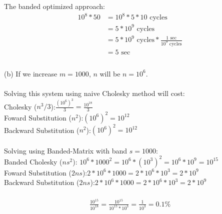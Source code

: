 \documentclass{article}
\begin{document}
	The banded optimized approach:\\
	\begin{align*}
	10^{8} * 50 &=	10^{8} * 5*10 \text{ cycles}\\
	&= 5*10^{9} \text{ cycles}\\
	&= 5*10^{9} \text{ cycles} * \frac{1 \text{ sec}}{10^9 \text{ cycles}}\\
	&= 5 \text{ sec}\\		
	\end{align*}
	\\
	(b) If we increase $m=1000$, $n$ will be $n=10^6$.\\\\
	Solving this system using naive Cholesky method will cost:\\
	Cholesky ($n^3/3$):$\frac{(10^6)^3}{3}=\frac{10^{18}}{3}$\\
	Foward Substitution ($n^2$):$(10^6)^2=10^{12}$\\
	Backward Substitution ($n^2$):$(10^6)^2=10^{12}$\\\\
	Solving using Banded-Matrix with band $s=1000$:\\
	Banded Cholesky ($ns^2$): $ 10^6 * 1000^2 = 10^6 * (10^3)^2 = 10^6 * 10^9 = 10^{15} $\\
	Foward Substitution ($2ns$):$ 2*10^{6}*1000 = 2*10^{6}*10^{3} = 2*10^9$\\
	Backward Substitution ($2ns$):$ 2*10^{6}*1000 = 2*10^{6}*10^{3} = 2*10^9$\\
	\\
	\begin{align*}
		\frac{10^{15}}{10^{18}} = \frac{10^{15}}{10^{15}*10^{3}} = \frac{1}{10^3} = 0.1 \%
	\end{align*}
\end{document}

